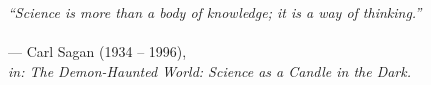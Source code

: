 \begin{epigrafe}
    \vspace*{\fill}
  \begin{flushright}

	\textit{``Science is more than a body of knowledge; it is a way of thinking.''} \\ ~ \\
	--- Carl Sagan (1934 -- 1996), \\ \textit{in: The Demon-Haunted World: Science as a Candle in the Dark.}

  \end{flushright}
\end{epigrafe}